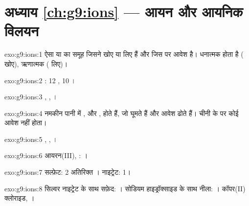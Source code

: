 \section*{अध्याय \ref{ch:g9:ions} --- आयन और आयनिक विलयन}

\begin{solution}{exo:g9:ions:1}
ऐसा  या  का समूह जिसने  खोए या लिए हैं और जिस पर
आवेश है।  धनात्मक होता है ( खोए),  ऋणात्मक
( लिए)।
\end{solution}

\begin{solution}{exo:g9:ions:2}
: 12 , 10 ।
\end{solution}

\begin{solution}{exo:g9:ions:3}
, , ।
\end{solution}

\begin{solution}{exo:g9:ions:4}
नमकीन पानी में ,  और , होते हैं, जो घूमते हैं और
आवेश ढोते हैं। चीनी के  पर कोई आवेश नहीं होता।
\end{solution}

\begin{solution}{exo:g9:ions:5}
, , ।
\end{solution}

\begin{solution}{exo:g9:ions:6}
आयरन(III), : ।
\end{solution}

\begin{solution}{exo:g9:ions:7}
सल्फ़ेट: 2 अतिरिक्त । नाइट्रेट: 1।
\end{solution}

\begin{solution}{exo:g9:ions:8}
सिल्वर नाइट्रेट के साथ सफ़ेद: । सोडियम हाइड्रॉक्साइड के साथ नीला:
। कॉपर(II) क्लोराइड, ।
\end{solution}

